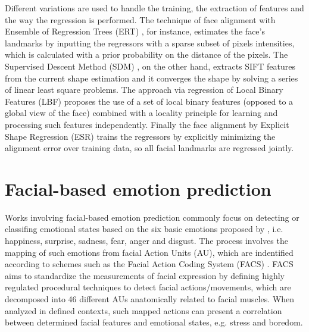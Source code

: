 Different variations are used to handle the training, the extraction of features and the way the regression is performed. The technique of face alignment with Ensemble of Regression Trees (ERT) \parencite{kazemi2014one}, for instance, estimates the face's landmarks by inputting the regressors with a sparse subset of pixels intensities, which is calculated with a prior probability on the distance of the pixels. The Supervised Descent Method (SDM) \parencite{xiong2013supervised}, on the other hand, extracts SIFT features from the current shape estimation and it converges the shape by solving a series of linear least square problems. The approach via regression of Local Binary Features (LBF) \parencite{ren2014face} proposes the use of a set of local binary features (opposed to a global view of the face) combined with a locality principle for learning and processing such features independently. Finally the face alignment by Explicit Shape Regression (ESR) \parencite{cao2014face} trains the regressors by explicitly minimizing the alignment error over training data, so all facial landmarks are regressed jointly.

\section{Facial-based emotion prediction}

Works involving facial-based emotion prediction commonly focus on detecting or classifing emotional states based on the six basic emotions proposed by \textcite{ekman1971constants}, i.e. happiness, surprise, sadness, fear, anger and disgust. The process involves the mapping of such emotions from facial Action Units (AU), which are indentified according to schemes such as the Facial Action Coding System (FACS) \parencite{ekman1977facial,cohn2007observer}. FACS aims to standardize the measurements of facial expression by defining highly regulated procedural techniques to detect facial actions/movements, which are decomposed into 46 different AUs anatomically related to facial muscles. When analyzed in defined contexts, such mapped actions can present a correlation between determined facial features and emotional states, e.g. stress and boredom.

